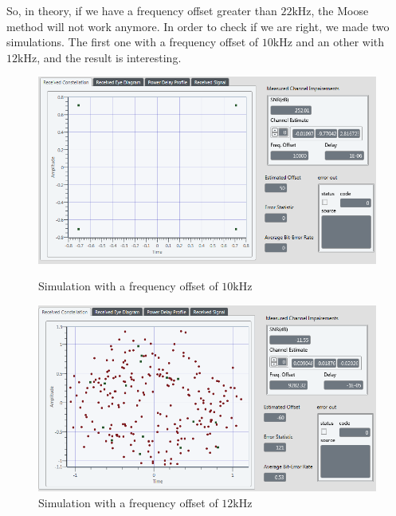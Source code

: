 \documentclass[frenchb, oneside, headings=normal]{scrartcl}
\begin{document}
So, in theory, if we have a frequency offset greater than $22 \si{\kilo\hertz}$, the Moose method will not work anymore. In order to check if we are right, we made two simulations. The first one with a frequency offset of $10 \si{\kilo\hertz}$ and an other with $12 \si{\kilo\hertz}$, and the result is interesting.\\

\begin{figure}[!ht]
    \begin{minipage}[b]{0.48\linewidth}
        \centering \includegraphics[scale=0.45]{img/test_Offset_10k_OK_limitMooseCheck.png}
     \caption{Simulation with a frequency offset of $10 \si{\kilo\hertz}$}
     \label{MooseLimit1}
    \end{minipage}\hfill
    \begin{minipage}[b]{0.48\linewidth}
         \centering \includegraphics[scale=0.45]{img/test_Offset_12k_OK_limitMooseCheck.png}
\caption{Simulation with a frequency offset of $12 \si{\kilo\hertz}$}
 \label{MooseLimit2}
    \end{minipage}
\end{figure}
\end{document}
